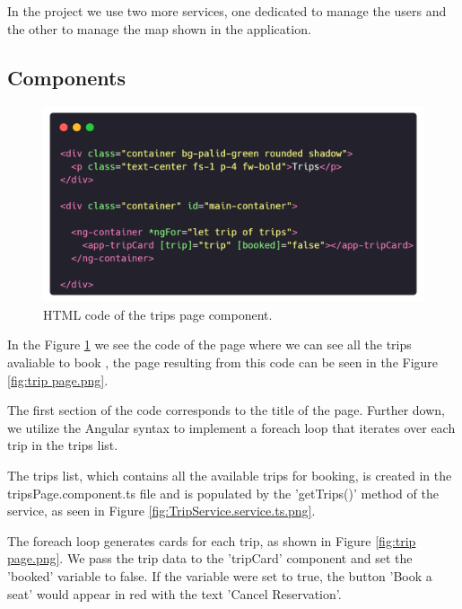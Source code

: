 \documentclass{article}
\begin{document}
    In the project we use two more services, one dedicated to manage the users and the other to manage the map shown in the application.

    \subsection*{Components}
    
    \begin{figure}[h]
      \centering
      \includegraphics[width=1\columnwidth]{figures/tripsPage.component.html.png}
      \caption{HTML code of the trips page component.\label{fig:tripsPage.component.html.png}}
      \end{figure}

      In the Figure \ref{fig:tripsPage.component.html.png} we see the code of the page where we can see all the trips avaliable to book \cite{caridaCode}, the page resulting from this code can be seen in the Figure \ref{fig:trip page.png}. 

      The first section of the code corresponds to the title of the page. Further down, we utilize the Angular syntax to implement a foreach loop that iterates over each trip in the trips list.

      The trips list, which contains all the available trips for booking, is created in the tripsPage.component.ts file and is populated by the 'getTrips()' method of the service, as seen in Figure \ref{fig:TripService.service.ts.png}. 

      The foreach loop generates cards for each trip, as shown in Figure \ref{fig:trip page.png}. We pass the trip data to the 'tripCard' component and set the 'booked' variable to false. If the variable were set to true, the button 'Book a seat' would appear in red with the text 'Cancel Reservation'.

    
\end{document}
